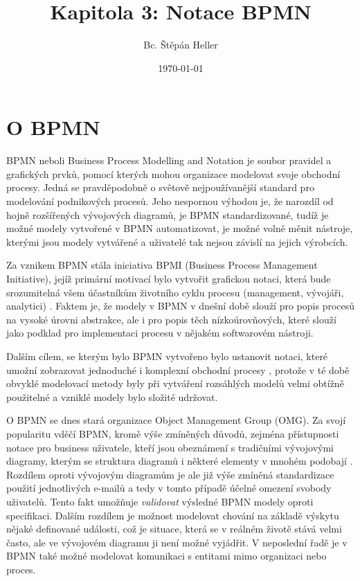 \documentclass[]{article}
\begin{document}
\title{Kapitola 3: Notace BPMN}
\author{Bc. Štěpán Heller}
\date{\today}
\maketitle

\section{O BPMN}
BPMN neboli Business Process Modelling and Notation je soubor pravidel a grafických prvků, pomocí kterých mohou organizace modelovat svoje obchodní procesy. Jedná se pravděpodobně o světově nejpoužívanější standard pro modelování podnikových procesů. Jeho nespornou výhodou je, že narozdíl od hojně rozšířených vývojových diagramů, je BPMN standardizované, tudíž je možné modely vytvořené v BPMN automatizovat, je možné volně měnit nástroje, kterými jsou modely vytvářené a uživatelé tak nejsou závislí na jejich výrobcích. 

Za vznikem BPMN stála iniciativa BPMI (Business Process Management Initiative), jejíž primární motivací bylo vytvořit grafickou notaci, která bude srozumitelná všem účastníkům životního cyklu procesu (management, vývojáři, analytici) \cite{Vasicek2008}. Faktem je, že modely v BPMN v dnešní době slouží pro popis procesů na vysoké úrovni abstrakce, ale i pro popis těch nízkoúrovňových, které slouží jako podklad pro implementaci procesu v nějakém softwarovém nástroji.

Dalším cílem, se kterým bylo BPMN vytvořeno bylo ustanovit notaci, které umožní zobrazovat jednoduché i komplexní obchodní procesy \cite{Vasicek2008}, protože v té době obvyklé modelovací metody byly při vytváření rozsáhlých modelů velmi obtížně použitelné a vzniklé modely bylo složité udržovat.

O BPMN se dnes stará organizace Object Management Group (OMG). Za svojí popularitu vděčí BPMN, kromě výše zmíněných důvodů, zejména přístupnosti notace pro business uživatele, kteří jsou obeznámení s tradičními vývojovými diagramy, kterým se struktura diagramů i některé elementy v mnohém podobají \cite{Silver2011}. Rozdílem oproti vývojovým diagramům je ale již výše zmíněná standardizace použití jednotlivých e-mailů a tedy v tomto případě účelné omezení svobody uživatelů. Tento fakt umožňuje \textit{validovat} výsledné BPMN modely oproti specifikaci. Dalším rozdílem je možnost modelovat chování na základě výskytu nějaké definované události, což je situace, která se v reálném životě stává velmi často, ale ve vývojovém diagramu ji není možné vyjádřit. V neposlední řadě je v BPMN také možné modelovat komunikaci s entitami mimo organizaci nebo proces.
\end{document}
